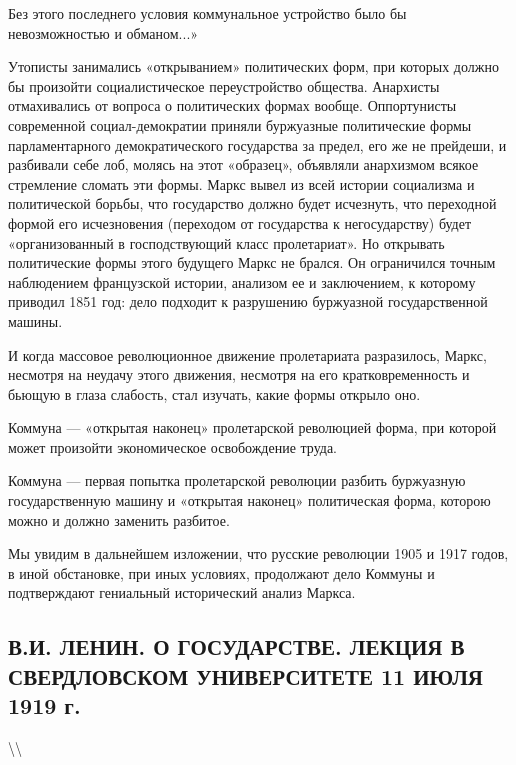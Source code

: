 \documentclass[12pt]{article}
\newcommand\ellipsis{%
  \textbackslash\thinspace\textellipsis\textbackslash
}
\newcommand{\parnum}{(\arabic{parcount})}
\newcounter{parcount}
\newenvironment{parnumbers}{%
  \par%
  \everypar{\noindent \stepcounter{parcount}\marginpar[]{\parnum}}%
}{}
\begin{document}
\begin{parnumbers}
Без этого последнего условия коммунальное устройство было бы невозможностью и обманом...»

Утописты занимались «открыванием» политических форм, при которых должно бы произойти социалистическое переустройство общества. Анархисты отмахивались от вопроса о политических формах вообще. Оппортунисты современной социал-демократии приняли буржуазные политические формы парламентарного демократического государства за предел, его же не прейдеши, и разбивали себе лоб, молясь на этот «образец», объявляли анархизмом всякое стремление сломать эти формы. Маркс вывел из всей истории социализма и политической борьбы, что государство должно будет исчезнуть, что переходной формой его исчезновения (переходом от государства к негосударству) будет «организованный в господствующий класс пролетариат». Но открывать политические формы этого будущего Маркс не брался. Он ограничился точным наблюдением французской истории, анализом ее и заключением, к которому приводил 1851 год: дело подходит к разрушению буржуазной государственной машины.

И когда массовое революционное движение пролетариата разразилось, Маркс, несмотря на неудачу этого движения, несмотря на его кратковременность и бьющую в глаза слабость, стал изучать, какие формы открыло оно.

Коммуна — «открытая наконец» пролетарской революцией форма, при которой может произойти экономическое освобождение труда.

Коммуна — первая попытка пролетарской революции разбить буржуазную государственную машину и «открытая наконец» политическая форма, которою можно и должно заменить разбитое.

Мы увидим в дальнейшем изложении, что русские революции 1905 и 1917 годов, в иной обстановке, при иных условиях, продолжают дело Коммуны и подтверждают гениальный исторический анализ Маркса.
\end{parnumbers}


\subsection{В.И. ЛЕНИН. О ГОСУДАРСТВЕ. ЛЕКЦИЯ В СВЕРДЛОВСКОМ УНИВЕРСИТЕТЕ 11 ИЮЛЯ 1919 г.}

\ellipsis
\end{document}

